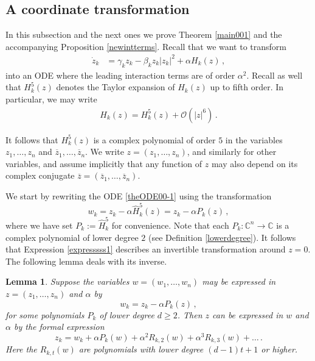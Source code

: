 \documentclass[12pt]{article}
\renewcommand{\mathcal}{\mathscr}
\theoremstyle{plain}
\newtheorem{lem}[thr]{Lemma}
\theoremstyle{definition}
\theoremstyle{remark}
\theoremstyle{remark}
\begin{document}
\subsection{A coordinate transformation}\label{thefirstreduction} 
In this subsection and the next ones we prove Theorem \ref{main001} and the accompanying Proposition \ref{newintterms}. Recall that we want to transform 
\begin{align}\label{theODE00-1}
\dot{z}_k &= \gamma_kz_k - \beta_k z_k|z_k|^2 + \alpha H_k(z) \, ,
\end{align}
into an ODE where the leading interaction terms are of order $\alpha^2$. Recall as well that $H_k^5(z)$ denotes the Taylor expansion of $H_k(z)$ up to fifth order. In particular, we may write 
\begin{align}\label{formofH1i}
    H_k(z) =  H^5_k(z) + \mathcal{O}(|z|^6)\, .
\end{align}

It follows that $H^5_k(z)$ is a complex polynomial of order $5$ in the variables $z_1, \dots, z_n$ and $\overline{z}_1, \dots, \overline{z}_n$. We write $z = (z_1, \dots, z_n)$, and similarly for other variables, and assume implicitly that any function of $z$ may also depend on its complex conjugate $\overline{z} = (\overline{z}_1, \dots, \overline{z}_n)$.


\noindent We start by rewriting the ODE \eqref{theODE00-1} using the transformation 
\begin{equation}\label{expresssss1}
w_k = z_k - \alpha \widehat{H}_k^5(z) =  z_k - \alpha P_k(z)   \, ,
\end{equation}
where we have set $P_k := \widehat{H}_k^5$ for convenience. Note that each $P_k: \mathbb{C}^n \rightarrow \mathbb{C}$ is a complex polynomial  of lower degree $2$ (see Definition \ref{lowerdegree}). It follows that Expression \eqref{expresssss1} describes an invertible transformation around $z = 0$. The following lemma deals with its inverse.

\begin{lem}\label{lemzinw0}
Suppose the variables $w = (w_1, \dots, w_n)$ may be expressed in $z = (z_1, \dots, z_n)$ and $\alpha$ by
\begin{equation}\label{expressss10}
w_k = z_k - \alpha P_k(z) \, ,
\end{equation}
for some polynomials $P_k$ of lower degree $d \geq 2$. Then $z$ can be expressed in $w$ and $\alpha$ by the formal expression
\begin{equation}\label{expressss20}
z_k = w_k+ \alpha P_k(w) + \alpha^2 R_{k,2}(w) + \alpha^3 R_{k,3}(w) + \dots \, .
\end{equation}
Here the $R_{k,t}(w)$ are polynomials with lower degree $(d-1)t+1$ or higher. 
\end{lem}
\end{document}
